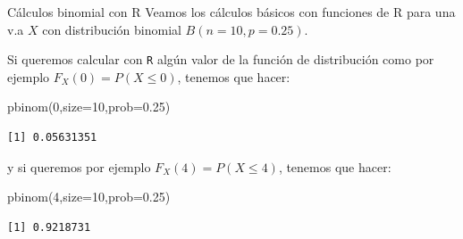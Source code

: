 \documentclass[
  ignorenonframetext,
  aspectratio=169]{beamer}
\newenvironment{Shaded}{\begin{snugshade}}{\end{snugshade}}
\newcommand{\AttributeTok}[1]{\textcolor[rgb]{0.40,0.45,0.13}{#1}}
\newcommand{\DecValTok}[1]{\textcolor[rgb]{0.68,0.00,0.00}{#1}}
\newcommand{\FloatTok}[1]{\textcolor[rgb]{0.68,0.00,0.00}{#1}}
\newcommand{\FunctionTok}[1]{\textcolor[rgb]{0.28,0.35,0.67}{#1}}
\newcommand{\NormalTok}[1]{\textcolor[rgb]{0.00,0.23,0.31}{#1}}
\begin{document}
\begin{frame}[fragile]{Cálculos binomial con R}
\protect\hypertarget{cuxe1lculos-binomial-con-r}{}
Veamos los cálculos básicos con funciones de R para una v.a \(X\) con
distribución binomial \(B(n=10,p=0.25)\).

Si queremos calcular con \texttt{R} algún valor de la función de
distribución como por ejemplo \(F_X(0)=P(X\leq 0)\), tenemos que hacer:

\begin{Shaded}
\begin{Highlighting}[]
\FunctionTok{pbinom}\NormalTok{(}\DecValTok{0}\NormalTok{,}\AttributeTok{size=}\DecValTok{10}\NormalTok{,}\AttributeTok{prob=}\FloatTok{0.25}\NormalTok{)}
\end{Highlighting}
\end{Shaded}

\begin{verbatim}
[1] 0.05631351
\end{verbatim}

y si queremos por ejemplo \(F_X(4)=P(X\leq 4)\), tenemos que hacer:

\begin{Shaded}
\begin{Highlighting}[]
\FunctionTok{pbinom}\NormalTok{(}\DecValTok{4}\NormalTok{,}\AttributeTok{size=}\DecValTok{10}\NormalTok{,}\AttributeTok{prob=}\FloatTok{0.25}\NormalTok{)}
\end{Highlighting}
\end{Shaded}

\begin{verbatim}
[1] 0.9218731
\end{verbatim}
\end{frame}
\end{document}
